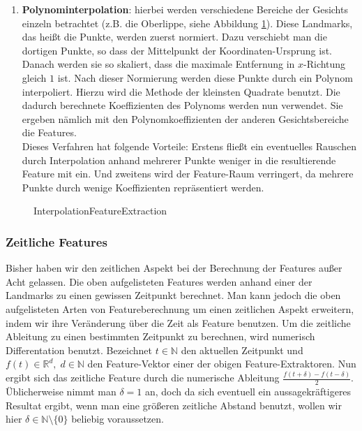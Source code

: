 \begin{enumerate}
  \item \textbf{Polynominterpolation}: 
     hierbei werden verschiedene Bereiche der Gesichts einzeln betrachtet (z.B. die Oberlippe, siehe Abbildung \ref{fig:interpol}).
     Diese Landmarks, das heißt die Punkte, werden zuerst normiert. Dazu verschiebt man die dortigen Punkte, so dass der Mittelpunkt der Koordinaten-Ursprung ist. Danach werden sie so skaliert, dass die maximale Entfernung in $x$-Richtung gleich $1$ ist.
     Nach dieser Normierung werden diese Punkte durch ein Polynom interpoliert. Hierzu wird die Methode der kleinsten Quadrate benutzt. Die dadurch berechnete Koeffizienten des Polynoms werden nun verwendet. Sie ergeben nämlich mit den Polynomkoeffizienten der anderen Gesichtsbereiche die Features.\\
     Dieses Verfahren hat folgende Vorteile: 
     Erstens fließt ein eventuelles Rauschen durch Interpolation anhand mehrerer Punkte  weniger in die resultierende Feature mit ein. Und zweitens wird der Feature-Raum verringert, da mehrere Punkte durch wenige Koeffizienten repräsentiert werden.
\end{enumerate}
\begin{figure}
\scalebox{ 0.9 }{

}
\caption{InterpolationFeatureExtraction}
\label{fig:interpol}
\end{figure}

\subsubsection{Zeitliche Features}
Bisher haben wir den zeitlichen Aspekt bei der Berechnung der Features außer Acht gelassen. Die oben aufgelisteten Features werden anhand einer der Landmarks zu einen gewissen Zeitpunkt berechnet.
Man kann jedoch die oben aufgelisteten Arten von Featureberechnung um einen zeitlichen Aspekt erweitern, indem wir ihre Veränderung über die Zeit als Feature benutzen. 
Um die zeitliche Ableitung zu einen bestimmten Zeitpunkt zu berechnen, wird numerisch Differentation benutzt. Bezeichnet $t\in\mathbb{N}$ den aktuellen Zeitpunkt und $f(t)\in\mathbb{R}^d,\;d\in\mathbb{N}$ den Feature-Vektor einer der obigen Feature-Extraktoren. Nun ergibt sich das zeitliche Feature durch die numerische Ableitung $\frac{f(t+\delta)-f(t-\delta)}{2}$. Üblicherweise nimmt man $\delta=1$ an, doch da sich eventuell ein aussagekräftigeres Resultat ergibt, wenn man eine größeren zeitliche Abstand benutzt, wollen wir hier $\delta\in\mathbb{N}\setminus\{0\}$  beliebig voraussetzen.

